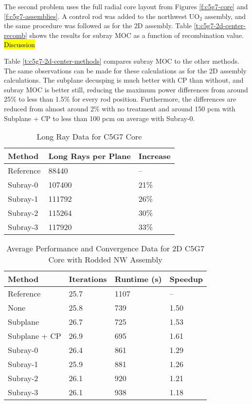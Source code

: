 The second problem uses the full radial core layout from Figures \ref{f:c5g7-core} and \ref{f:c5g7-assemblies}.  A control rod was added to the northwest UO$_2$ assembly, and the same procedure was followed as for the 2D assembly.  Table \ref{t:c5g7-2d-center-recomb} shows the results for subray MOC as a function of recombination value.  \hl{Discussion}

Table \ref{t:c5g7-2d-center-methods} compares subray MOC to the other methods. The same observations can be made for these calculations as for the 2D assembly calculations.  The subplane decusping is much better with CP than without, and subray MOC is better still, reducing the maximum power differences from around 25\% to less than 1.5\% for every rod position.  Furthermore, the \keff{} differences are reduced from almost around 2\% with no treatment and around 150 pcm with Subplane + CP to less than 100 pcm on average with Subray-0.

\begin{table}[h]
    \centering
    \caption{Long Ray Data for C5G7 Core}\label{t:subray-data-2dcore}
    \begin{tabular}{l l l }\toprule
        Method & Long Rays per Plane & Increase \\\midrule
        Reference & 88440 & -- \\
        Subray-0 & 107400 & 21\% \\
        Subray-1 & 111792 & 26\% \\
        Subray-2 & 115264 & 30\% \\
        Subray-3 & 117920 & 33\% \\
        \bottomrule
    \end{tabular}
\end{table}

\begin{table}[h]
    \centering
    \caption[2D C5G7 Core Performance Data, Center Assembly]{Average Performance and Convergence Data for 2D C5G7 Core with Rodded NW Assembly}\label{t:subray-performance-2dcoreNW}
    \begin{tabular}{l l l l}\toprule
        Method & Iterations & Runtime (s) & Speedup \\\midrule
Reference     & 25.7 & 1107 & --  \\
None          & 25.8 & 739 & 1.50 \\ 
Subplane      & 26.7 & 725 & 1.53 \\ 
Subplane + CP & 26.9 & 695 & 1.61 \\
Subray-0      & 26.4 & 861 & 1.29 \\ 
Subray-1      & 25.9 & 881 & 1.26 \\ 
Subray-2      & 26.1 & 920 & 1.21 \\ 
Subray-3      & 26.1 & 938 & 1.18 \\ 
        \bottomrule
    \end{tabular}
\end{table}


